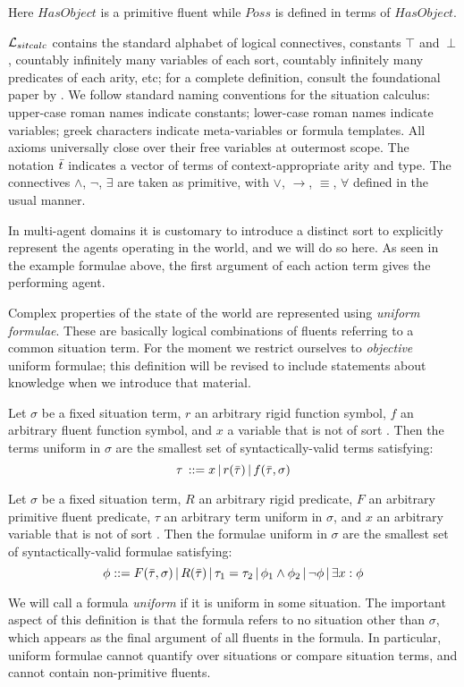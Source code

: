 Here $HasObject$ is a primitive fluent while $Poss$ is defined in
terms of $HasObject$.\medskip{}


$\mathcal{L}_{sitcalc}$ contains the standard alphabet of logical connectives, constants
$\top$ and $\ \bot$, countably infinitely many variables of each
sort, countably infinitely many predicates of each arity, etc; for
a complete definition, consult the foundational paper by \citet{pirri99contributions_sitcalc}.
We follow standard naming conventions for the situation calculus:
upper-case roman names indicate constants; lower-case roman names
indicate variables; greek characters indicate meta-variables or formula
templates. All axioms universally close over their free variables
at outermost scope. The notation $\bar{t}$ indicates a vector of
terms of context-appropriate arity and type. The connectives $\wedge$,
$\neg$, $\exists$ are taken as primitive, with $\vee$, $\rightarrow$,
$\equiv$, $\forall$ defined in the usual manner.

In multi-agent domains it is customary to introduce a distinct sort
 to explicitly represent the agents operating in the world,
and we will do so here. As seen in the example formulae above, the
first argument of each action term gives the performing agent.

Complex properties of the state of the world are represented using
\emph{uniform formulae}. These are basically logical combinations
of fluents referring to a common situation term. For the moment we
restrict ourselves to \emph{objective} uniform formulae; this definition
will be revised to include statements about knowledge when we introduce
that material.

\begin{defnL}
 Let $\sigma$ be a fixed situation term,
$r$ an arbitrary rigid function symbol, $f$ an arbitrary fluent
function symbol, and $x$ a variable that is not of sort .
Then the terms uniform in $\sigma$ are the smallest set of syntactically-valid
terms satisfying:\[
\tau\,::=x\,|\, r(\bar{\tau})\,|\, f(\bar{\tau},\sigma)\]

\begin{defnL}
 Let $\sigma$ be a fixed situation
term, $R$ an arbitrary rigid predicate, $F$ an arbitrary primitive
fluent predicate, $\tau$ an arbitrary term uniform in $\sigma$,
and $x$ an arbitrary variable that is not of sort .
Then the formulae uniform in $\sigma$ are the smallest set of syntactically-valid
formulae satisfying:\[
\phi::=F(\bar{\tau},\sigma)\,|\, R(\bar{\tau})\,|\,\tau_{1}=\tau_{2}\,|\,\phi_{1}\wedge\phi_{2}\,|\,\neg\phi\,|\,\exists x:\phi\]

\end{defnL}
\end{defnL}
We will call a formula \emph{uniform} if it is uniform in some situation.
The important aspect of this definition is that the formula refers
to no situation other than $\sigma$, which appears as the final argument
of all fluents in the formula. In particular, uniform formulae cannot
quantify over situations or compare situation terms, and cannot contain
non-primitive fluents.

